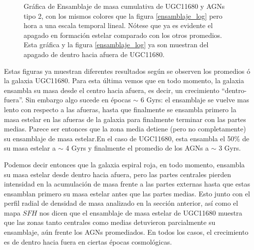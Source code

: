 \begin{figure}[htbp]
\centering
{}
\caption[Historia de Crecimiento de Masa con tiempo lineal, UGC11680 y AGNs tipo 2]{Gráfica de Ensamblaje de masa cumulativa de UGC11680 y AGNs tipo 2, con los mismos colores que la figura \ref{ensamblaje_log} pero hora a una escala temporal lineal. Nótese que ya es evidente el apagado en formación estelar comparado con los otros promedios. Esta gráfica y la figura \ref{ensamblaje_log} ya son muestran del apagado de dentro hacia afuera de UGC11680.}
\label{ensamblaje_lineal}
\end{figure}



\noindent Estas figuras ya muestran diferentes resultados según se observen los promedios ó la galaxia UGC11680. Para esta última vemos que en todo momento, la galaxia ensambla su masa desde el centro hacia afuera, es decir, un crecimiento ``dentro-fuera''. Sin embargo algo sucede en épocas $\sim$ 6 Gyrs: el ensamblaje se vuelve mas lento con respecto a las afueras, hasta que finalmente se ensambla primero la masa estelar en las afueras de la galaxia para finalmente terminar con las partes medias. Parece ser entonces que la zona media detiene (pero no completamente) su ensamblaje de masa estelar.En el caso de UGC11680, esta ensambla el 50\% de su masa estelar a $\sim$ 4 Gyrs y finalmente el promedio de los AGNs a  $\sim$ 3 Gyrs.

\bigskip

\noindent Podemos decir entonces que la galaxia espiral roja, en todo momento, ensambla su masa estelar desde dentro hacia afuera, pero las partes centrales pierden intensidad en la acumulación de masa frente a las partes externas hasta que  estas ensamblan primero su masa estelar antes que las partes medias. Esto junto con el perfil radial de densidad de masa analizado en la sección anterior, así como el mapa $SFH$ nos dicen que el ensamblaje de masa estelar de UGC11680 muestra que las zonas tanto centrales como medias detuvieron parcialmente su ensamblaje, aún frente los AGNs promediados. En todos los casos, el crecimiento es de dentro hacia fuera en ciertas épocas cosmológicas.




